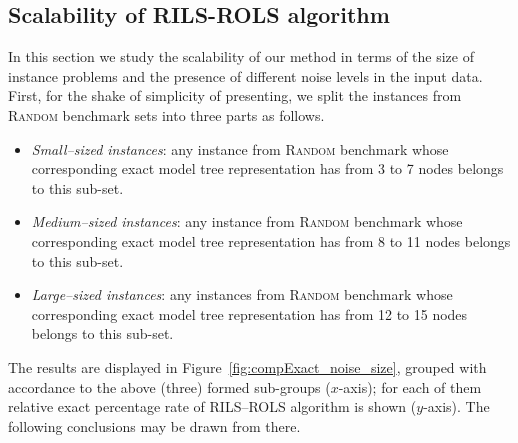 \documentclass{bmcart}
\begin{document}
\subsection{Scalability of \textsc{RILS}-\textsc{ROLS} algorithm}\label{sec:scalability-rils-rols}

In this section we study the scalability of our method in terms of the size of  instance problems and  the presence of different noise levels in the input data.  First, for the shake of simplicity of presenting,  we split the instances from \textsc{Random} benchmark sets into three parts as follows. 
\begin{itemize}
	\item \textit{Small--sized instances}: any instance  from \textsc{Random} benchmark whose   corresponding exact model  tree representation  has from 3 to 7 nodes belongs to this sub-set.
	\item \textit{Medium--sized instances}:  any instance  from \textsc{Random} benchmark whose   corresponding exact model tree representation  has from 8 to 11 nodes belongs to this sub-set.
	\item \textit{Large--sized instances}: any instances from \textsc{Random} benchmark whose   corresponding exact model  tree representation  has from 12 to 15 nodes belongs to this sub-set. 
\end{itemize}

The results are displayed in Figure~\ref{fig:compExact_noise_size}, grouped with accordance to the above (three) formed sub-groups ($x$-axis); for each of them relative exact percentage rate   of \textsc{RILS}--\textsc{ROLS} algorithm is shown ($y$-axis). The following conclusions may be drawn from there. 
\end{document}
